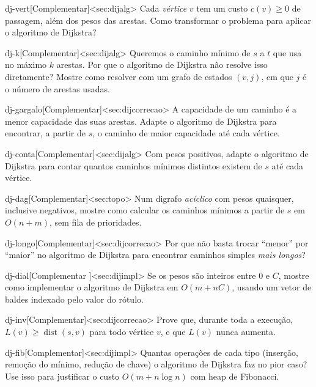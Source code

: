 \begin{exercicio}{dj-vert}[Complementar]<sec:dijalg>
Cada \emph{vértice} $v$ tem um custo $c(v)\ge0$ de passagem, além dos pesos das arestas. Como transformar o problema para aplicar o algoritmo de Dijkstra?
\end{exercicio}
\begin{exercicio}{dj-k}[Complementar]<sec:dijalg>
Queremos o caminho mínimo de $s$ a $t$ que usa no máximo $k$ arestas. Por que o algoritmo de Dijkstra não resolve isso diretamente? Mostre como resolver com um grafo de estados $(v,j)$, em que $j$ é o número de arestas usadas.
\end{exercicio}
\begin{exercicio}{dj-gargalo}[Complementar]<sec:dijcorrecao>
A capacidade de um caminho é a menor capacidade das suas arestas. Adapte o algoritmo de Dijkstra para encontrar, a partir de $s$, o caminho de maior capacidade até cada vértice.
\end{exercicio}
\begin{exercicio}{dj-conta}[Complementar]<sec:dijalg>
Com pesos positivos, adapte o algoritmo de Dijkstra para contar quantos caminhos mínimos distintos existem de $s$ até cada vértice.
\end{exercicio}
\begin{exercicio}{dj-dag}[Complementar]<sec:topo>
Num digrafo \emph{acíclico} com pesos quaisquer, inclusive negativos, mostre como calcular os caminhos mínimos a partir de $s$ em $O(n+m)$, sem fila de prioridades.
\end{exercicio}
\begin{exercicio}{dj-longo}[Complementar]<sec:dijcorrecao>
Por que não basta trocar ``menor'' por ``maior'' no algoritmo de Dijkstra para encontrar caminhos simples \emph{mais longos}?
\end{exercicio}
\begin{exercicio}{dj-dial}[Complementar \estrela]<sec:dijimpl>
Se os pesos são inteiros entre 0 e $C$, mostre como implementar o algoritmo de Dijkstra em $O(m+nC)$, usando um vetor de baldes indexado pelo valor do rótulo.
\end{exercicio}
\begin{exercicio}{dj-inv}[Complementar]<sec:dijcorrecao>
Prove que, durante toda a execução, $L(v)\ge\operatorname{dist}(s,v)$ para todo vértice $v$, e que $L(v)$ nunca aumenta.
\end{exercicio}
\begin{exercicio}{dj-fib}[Complementar]<sec:dijimpl>
Quantas operações de cada tipo (inserção, remoção do mínimo, redução de chave) o algoritmo de Dijkstra faz no pior caso? Use isso para justificar o custo $O(m+n\log n)$ com heap de Fibonacci.
\end{exercicio}
